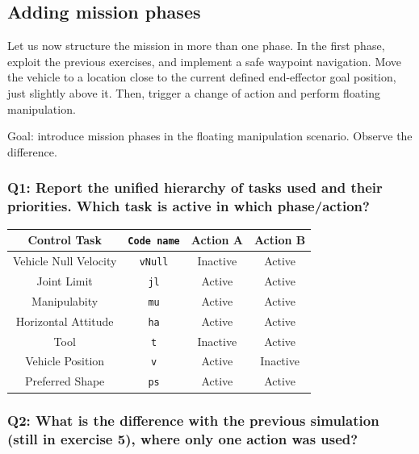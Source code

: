 \documentclass{article}
\begin{document}
\clearpage

\subsection{Adding mission phases}
Let us now structure the mission in more than one phase. In the first phase, exploit the previous exercises, and implement a safe waypoint navigation. Move the vehicle to a location close to the current defined end-effector goal position, just slightly above it. Then, trigger a change of action and perform floating manipulation.

Goal: introduce mission phases in the floating manipulation scenario. Observe the difference.

\subsubsection{Q1: Report the unified hierarchy of tasks used and their priorities. Which task is active in which phase/action?}

\begin{center}
\begin{tabular}{ | c | c | c | c |}
\hline
 Control Task & \texttt{Code name} & Action A & Action B \\
 \hline
 Vehicle Null Velocity & \texttt{vNull} & Inactive & Active \\
 Joint Limit & \texttt{jl} & Active & Active \\
 Manipulabity &  \texttt{mu} & Active & Active\\
 Horizontal Attitude &  \texttt{ha} & Active & Active \\
 Tool  &  \texttt{t} & Inactive & Active\\
 Vehicle Position &  \texttt{v} &Active & Inactive\\
 Preferred Shape & \texttt{ps} & Active & Active\\
 \hline
\end{tabular}
\end{center}

\subsubsection{Q2: What is the difference with the previous simulation (still in exercise 5), where only one action was used?}
\end{document}
